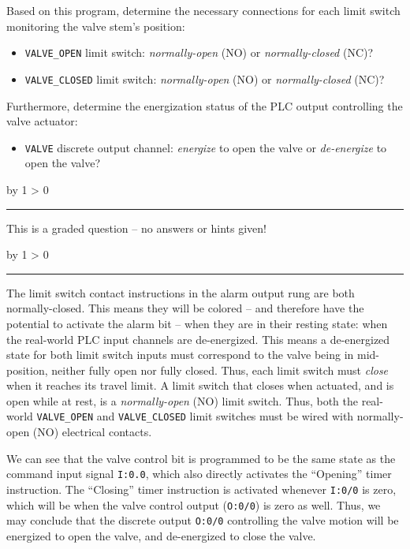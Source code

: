 \documentclass[12pt,a4paper]{article}
\def\svar{
           \advance\answnum by 1
           \ifnum \answnum > 0
                \hrule
                \vskip 3pt
                \leftline{Svar \the\answnum}
                \vskip 3pt \fi}
\def\notes{
           \advance\explnum by 1
           \ifnum \explnum > 0
                \hrule
                \vskip 3pt
                \leftline{Notes \the\explnum}
                \vskip 3pt \fi}
\begin{document}
\vskip 20pt

Based on this program, determine the necessary connections for each limit switch monitoring the valve stem's position:

\begin{itemize}
\item{} {\tt VALVE\_OPEN} limit switch: {\it normally-open} (NO) or {\it normally-closed} (NC)?
\vskip 5pt
\item{} {\tt VALVE\_CLOSED} limit switch: {\it normally-open} (NO) or {\it normally-closed} (NC)?
\end{itemize}

\vskip 20pt

Furthermore, determine the energization status of the PLC output controlling the valve actuator:

\begin{itemize}
\item{} {\tt VALVE} discrete output channel: {\it energize} to open the valve or {\it de-energize} to open the valve?
\end{itemize}

\vfil
{}
\eject
\vskip 10pt \filbreak 





\svar{} 

This is a graded question -- no answers or hints given!

\vskip 10pt \filbreak 





\notes{} 

The limit switch contact instructions in the alarm output rung are both normally-closed.  This means they will be colored -- and therefore have the potential to activate the alarm bit -- when they are in their resting state: when the real-world PLC input channels are de-energized.  This means a de-energized state for both limit switch inputs must correspond to the valve being in mid-position, neither fully open nor fully closed.  Thus, each limit switch must {\it close} when it reaches its travel limit.  A limit switch that closes when actuated, and is open while at rest, is a {\it normally-open} (NO) limit switch.  Thus, both the real-world {\tt VALVE\_OPEN} and {\tt VALVE\_CLOSED} limit switches must be wired with normally-open (NO) electrical contacts.

\vskip 10pt

We can see that the valve control bit is programmed to be the same state as the command input signal {\tt I:0.0}, which also directly activates the ``Opening'' timer instruction.  The ``Closing'' timer instruction is activated whenever {\tt I:0/0} is zero, which will be when the valve control output ({\tt O:0/0}) is zero as well.  Thus, we may conclude that the discrete output {\tt O:0/0} controlling the valve motion will be energized to open the valve, and de-energized to close the valve.
\end{document}
